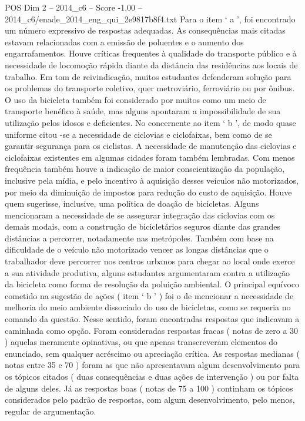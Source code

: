 \begin{textsample}{POS Dim 2 – 2014\_c6 – Score -1.00 – 2014\_c6/enade\_2014\_eng\_qui\_2e9817b8f4.txt}
Para o item ‘ a ’, foi encontrado um número expressivo de respostas adequadas.
As consequências mais citadas estavam relacionadas com a emissão de poluentes e o aumento dos engarrafamentos.
Houve críticas frequentes à qualidade do transporte público e à necessidade de locomoção rápida diante da distância das residências aos locais de trabalho.
Em tom de reivindicação, muitos estudantes defenderam solução para os problemas do transporte coletivo, quer metroviário, ferroviário ou por ônibus.
O uso da bicicleta também foi considerado por muitos como um meio de transporte benéfico à saúde, mas alguns apontaram a impossibilidade de sua utilização pelos idosos e deficientes.
No concernente ao item ‘ b ’, de modo quase uniforme citou -se a necessidade de ciclovias e ciclofaixas, bem como de se garantir segurança para os ciclistas.
A necessidade de manutenção das ciclovias e ciclofaixas existentes em algumas cidades foram também lembradas.
Com menos frequência também houve a indicação de maior conscientização da população, inclusive pela mídia, e pelo incentivo à aquisição desses veículos não motorizados, por meio da diminuição de impostos para redução do custo de aquisição.
Houve quem sugerisse, inclusive, uma política de doação de bicicletas.
Alguns mencionaram a necessidade de se assegurar integração das ciclovias com os demais modais, com a construção de bicicletários seguros diante das grandes distâncias a percorrer, notadamente nas metrópoles.
Também com base na dificuldade de o veículo não motorizado vencer as longas distâncias que o trabalhador deve percorrer nos centros urbanos para chegar ao local onde exerce a sua atividade produtiva, alguns estudantes argumentaram contra a utilização da bicicleta como forma de resolução da poluição ambiental.
O principal equívoco cometido na sugestão de ações ( item ‘ b ’ ) foi o de mencionar a necessidade de melhoria do meio ambiente dissociado do uso de bicicletas, como se requeria no comando da questão.
Nesse sentido, foram encontradas respostas que indicavam a caminhada como opção.
Foram consideradas respostas fracas ( notas de zero a 30 ) aquelas meramente opinativas, ou que apenas transcreveram elementos do enunciado, sem qualquer acréscimo ou apreciação crítica.
As respostas medianas ( notas entre 35 e 70 ) foram as que não apresentavam algum desenvolvimento para os tópicos citados ( duas consequências e duas ações de intervenção ) ou por falta de alguns deles.
Já as respostas boas ( notas de 75 a 100 ) continham os tópicos considerados pelo padrão de respostas, com algum desenvolvimento, pelo menos, regular de argumentação.

\end{textsample}
